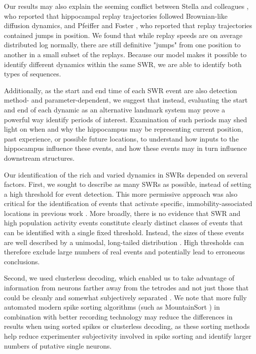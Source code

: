 \documentclass[times, twoside]{zHenriquesLab-StyleBioRxiv}
\begin{document}
Our results may also explain the seeming conflict between Stella and colleagues \cite{StellaHippocampalReactivationRandom2019}, who reported that hippocampal replay trajectories followed Brownian-like diffusion dynamics, and Pfeiffer and Foster \cite{PfeifferAutoassociativedynamicsgeneration2015}, who reported that replay trajectories contained jumps in position. We found that while replay speeds are on average distributed log normally, there are still definitive "jumps" from one position to another in a small subset of the replays. Because our model makes it possible to identify different dynamics within the same SWR, we are able to identify both types of sequences. 

Additionally, as the start and end time of each SWR event are also detection method- and parameter-dependent, we suggest that instead, evaluating the start and end of each dynamic as an alternative landmark system may prove a powerful way identify periods of interest. Examination of such periods may shed light on when and why the hippocampus may be representing current position, past experience, or possible future locations, to understand how inputs to the hippocampus influence these events, and how these events may in turn influence downstream structures.

Our identification of the rich and varied dynamics in SWRs depended on several factors. First, we sought to describe as many SWRs as possible, instead of setting a high threshold for event detection. This more permissive approach was also critical for the identification of events that activate specific, immobility-associated locations in previous work \cite{JaiDistincthippocampalcorticalmemory2017}. More broadly, there is no evidence that SWR and high population activity events constitute clearly distinct classes of events that can be identified with a single fixed threshold. Instead, the sizes of these events are well described by a unimodal, long-tailed distribution \cite{ChengNewExperiencesEnhance2008}. High thresholds can therefore exclude large numbers of real events and potentially lead to erroneous conclusions. 

Second, we used clusterless decoding, which enabled us to take advantage of information from neurons farther away from the tetrodes and not just those that could be cleanly and somewhat subjectively separated \cite{ChenBayesiannonparametricmethods2016, KloostermanBayesiandecodingusing2014, DengRapidclassificationhippocampal2016}. We note that more fully automated modern spike sorting algorithms (such as MountainSort \cite{ChungFullyAutomatedApproach2017}) in combination with better recording technology may reduce the differences in results when using sorted spikes or clusterless decoding, as these sorting methods help reduce  experimenter subjectivity involved in spike sorting and identify larger numbers of putative single neurons.  
\end{document}
